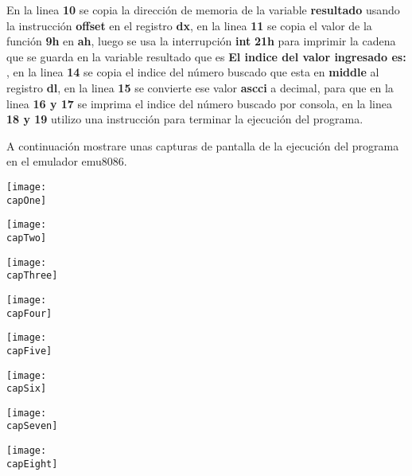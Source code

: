 \documentclass[a4paper,twoside]{article}
\newcommand{\codebordo}[1]{\textcolor{codebordo}{#1}}
\newcommand{\codeblue}[1]{\textcolor{codeblue}{#1}}
\newcommand{\codepurple}[1]{\textcolor{codepurple}{#1}}
\newcommand{\capOne}{./Capturas-emu/Captura-1.jpg}
\newcommand{\capTwo}{./Capturas-emu/Captura-2.jpg}
\newcommand{\capThree}{./Capturas-emu/Captura-3.jpg}
\newcommand{\capFour}{./Capturas-emu/Captura-4.jpg}
\newcommand{\capFive}{./Capturas-emu/Captura-5.jpg}
\newcommand{\capSix}{./Capturas-emu/Captura-6.jpg}
\newcommand{\capSeven}{./Capturas-emu/Captura-7.jpg}
\newcommand{\capEight}{./Capturas-emu/Captura-8.jpg}
\begin{document}
 {
   \Large En la linea \textbf{10} se copia la dirección de memoria de la variable \textbf{resultado} usando la instrucción \codeblue{\textbf{offset}} en el registro
  \codebordo{\textbf{dx}}, en la linea \textbf{11} se copia el valor de la función \textbf{9h} en \codebordo{\textbf{ah}}, luego se usa la interrupción 
  \codeblue{\textbf{int}} \textbf{21h} para imprimir la cadena que se guarda en la variable resultado que es \codepurple{\textbf{El indice del valor ingresado es: }},
  en la linea \textbf{14} se copia el indice del número buscado que esta en \textbf{middle} al registro \codebordo{\textbf{dl}}, en la linea \textbf{15} se convierte 
  ese valor \textbf{ascci} a decimal, para que en la linea \textbf{16 y 17} se imprima el indice del número buscado por consola, en la linea \textbf{18 y 19} utilizo 
  una instrucción para terminar la ejecución del programa.
 }

 {\Large 
     A continuación mostrare unas capturas de pantalla de la ejecución del programa en el emulador emu8086.
 }
    \newpage
    \begin{center}
      \texttt{[image: \\capOne]}
    \end{center}
    \vspace*{1cm}
    \begin{center}
      \texttt{[image: \\capTwo]}
    \end{center}
    \newpage

    \begin{center}
      \texttt{[image: \\capThree]}
    \end{center}
    \vspace*{1cm}
    \begin{center}
      \texttt{[image: \\capFour]}
    \end{center}
    \newpage

    \vspace*{-2cm}
    \begin{center}
      \texttt{[image: \\capFive]}
    \end{center}
    \begin{center}
      \texttt{[image: \\capSix]}
    \end{center}
    \newpage

    \begin{center}
      \texttt{[image: \\capSeven]}
    \end{center}
    \begin{center}
      \texttt{[image: \\capEight]}
    \end{center}
\end{document}
